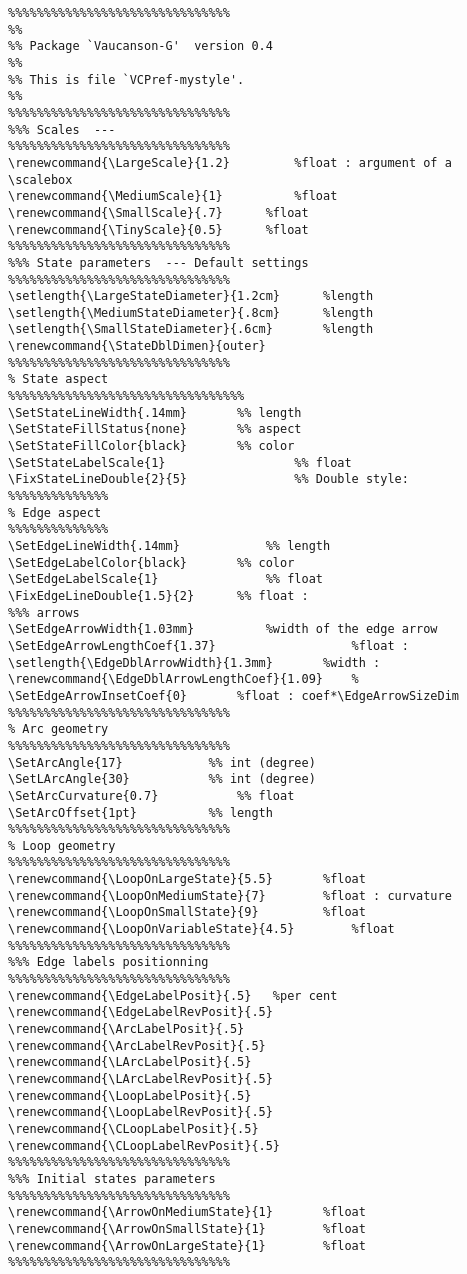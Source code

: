 \documentclass[11pt,twoside]{article}
\begin{document}
{\bigskip\bigskip
{\footnotesize
\begin{verbatim}
%%%%%%%%%%%%%%%%%%%%%%%%%%%%%%%
%%
%% Package `Vaucanson-G'  version 0.4
%%
%% This is file `VCPref-mystyle'.
%%  
%%%%%%%%%%%%%%%%%%%%%%%%%%%%%%%
%%% Scales  --- 
%%%%%%%%%%%%%%%%%%%%%%%%%%%%%%%
\renewcommand{\LargeScale}{1.2}         %float : argument of a \scalebox
\renewcommand{\MediumScale}{1}          %float
\renewcommand{\SmallScale}{.7}		%float
\renewcommand{\TinyScale}{0.5}		%float
%%%%%%%%%%%%%%%%%%%%%%%%%%%%%%%
%%% State parameters  --- Default settings
%%%%%%%%%%%%%%%%%%%%%%%%%%%%%%%
\setlength{\LargeStateDiameter}{1.2cm}		%length
\setlength{\MediumStateDiameter}{.8cm}		%length
\setlength{\SmallStateDiameter}{.6cm}		%length
\renewcommand{\StateDblDimen}{outer}
%%%%%%%%%%%%%%%%%%%%%%%%%%%%%%%
% State aspect
%%%%%%%%%%%%%%%%%%%%%%%%%%%%%%%%%
\SetStateLineWidth{.14mm}		%% length
\SetStateFillStatus{none}		%% aspect
\SetStateFillColor{black}		%% color
\SetStateLabelScale{1}                  %% float
\FixStateLineDouble{2}{5}               %% Double style: 
%%%%%%%%%%%%%%
% Edge aspect
%%%%%%%%%%%%%%
\SetEdgeLineWidth{.14mm}			%% length
\SetEdgeLabelColor{black}		%% color
\SetEdgeLabelScale{1}		        %% float
\FixEdgeLineDouble{1.5}{2}		%% float : 
%%% arrows
\SetEdgeArrowWidth{1.03mm}			%width of the edge arrow
\SetEdgeArrowLengthCoef{1.37}                   %float : 
\setlength{\EdgeDblArrowWidth}{1.3mm}		%width : 
\renewcommand{\EdgeDblArrowLengthCoef}{1.09}	% 
\SetEdgeArrowInsetCoef{0}		%float : coef*\EdgeArrowSizeDim
%%%%%%%%%%%%%%%%%%%%%%%%%%%%%%%
% Arc geometry
%%%%%%%%%%%%%%%%%%%%%%%%%%%%%%%
\SetArcAngle{17}			%% int (degree)
\SetLArcAngle{30}			%% int (degree)
\SetArcCurvature{0.7}			%% float
\SetArcOffset{1pt}			%% length
%%%%%%%%%%%%%%%%%%%%%%%%%%%%%%%
% Loop geometry
%%%%%%%%%%%%%%%%%%%%%%%%%%%%%%%
\renewcommand{\LoopOnLargeState}{5.5} 		%float
\renewcommand{\LoopOnMediumState}{7}		%float : curvature
\renewcommand{\LoopOnSmallState}{9} 		%float
\renewcommand{\LoopOnVariableState}{4.5} 		%float
%%%%%%%%%%%%%%%%%%%%%%%%%%%%%%%
%%% Edge labels positionning
%%%%%%%%%%%%%%%%%%%%%%%%%%%%%%%
\renewcommand{\EdgeLabelPosit}{.5}   %per cent 
\renewcommand{\EdgeLabelRevPosit}{.5}
\renewcommand{\ArcLabelPosit}{.5}
\renewcommand{\ArcLabelRevPosit}{.5}
\renewcommand{\LArcLabelPosit}{.5}
\renewcommand{\LArcLabelRevPosit}{.5}
\renewcommand{\LoopLabelPosit}{.5}
\renewcommand{\LoopLabelRevPosit}{.5}
\renewcommand{\CLoopLabelPosit}{.5}
\renewcommand{\CLoopLabelRevPosit}{.5}
%%%%%%%%%%%%%%%%%%%%%%%%%%%%%%%
%%% Initial states parameters
%%%%%%%%%%%%%%%%%%%%%%%%%%%%%%%
\renewcommand{\ArrowOnMediumState}{1}		%float 
\renewcommand{\ArrowOnSmallState}{1} 		%float
\renewcommand{\ArrowOnLargeState}{1}		%float
%%%%%%%%%%%%%%%%%%%%%%%%%%%%%%%
\end{verbatim}}

}
\end{document}
